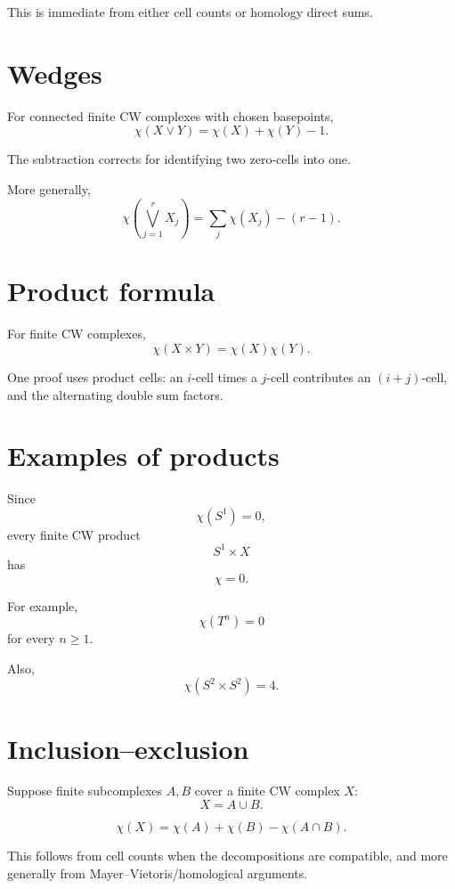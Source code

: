 This is immediate from either cell counts or homology direct sums.

\section{Wedges}

For connected finite CW complexes with chosen basepoints,
\[
\chi(X\vee Y)
=
\chi(X)+\chi(Y)-1.
\]

The subtraction corrects for identifying two zero-cells into one.

More generally,
\[
\chi\left(\bigvee_{j=1}^rX_j\right)
=
\sum_j\chi(X_j)-(r-1).
\]

\section{Product formula}

\begin{theorem}
\label{thm:viii21-product}
For finite CW complexes,
\[
\chi(X\times Y)
=
\chi(X)\chi(Y).
\]
\end{theorem}

One proof uses product cells: an \(i\)-cell times a \(j\)-cell contributes an
\((i+j)\)-cell, and the alternating double sum factors.

\section{Examples of products}

Since
\[
\chi(S^1)=0,
\]
every finite CW product
\[
S^1\times X
\]
has
\[
\chi=0.
\]

For example,
\[
\chi(T^n)=0
\]
for every \(n\ge1\).

Also,
\[
\chi(S^2\times S^2)=4.
\]

\section{Inclusion--exclusion}

Suppose finite subcomplexes \(A,B\) cover a finite CW complex \(X\):
\[
X=A\cup B.
\]

\begin{theorem}
\label{thm:viii21-inclusion-exclusion}
\[
\chi(X)
=
\chi(A)+\chi(B)-\chi(A\cap B).
\]
\end{theorem}

This follows from cell counts when the decompositions are compatible, and more
generally from Mayer--Vietoris/homological arguments.

